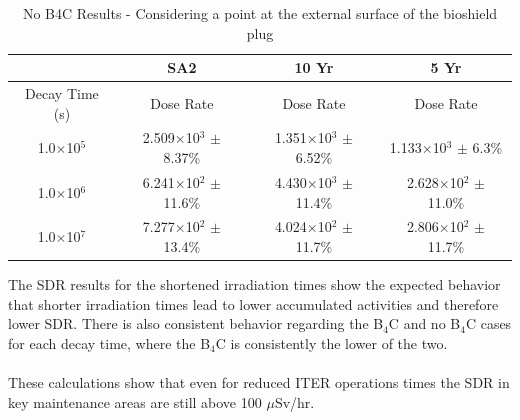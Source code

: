 \documentclass[12pt]{article}
\begin{document}
\begin{table}[ht!]
   \centering      
   \begin{tabular}{| c | c | c | c |}
      \hline
      & SA2 & 10 Yr & 5 Yr \\
      \hline
      Decay Time (s) & Dose Rate & Dose Rate & Dose Rate \\
      \hline
      1.0$\times$10$^{5}$ & 2.509$\times$10$^{3}$ $\pm$ 8.37\% & 1.351$\times$10$^{3}$ $\pm$ 6.52\% & 1.133$\times$10$^{3}$ $\pm$ 6.3\%\\
      1.0$\times$10$^{6}$ & 6.241$\times$10$^{2}$ $\pm$ 11.6\% & 4.430$\times$10$^{3}$ $\pm$ 11.4\% & 2.628$\times$10$^{2}$ $\pm$ 11.0\%\\
      1.0$\times$10$^{7}$ & 7.277$\times$10$^{2}$ $\pm$ 13.4\% & 4.024$\times$10$^{2}$ $\pm$ 11.7\% & 2.806$\times$10$^{2}$ $\pm$ 11.7\%\\
      \hline
\end{tabular}
\caption{No B4C Results - Considering a point at the external surface of the bioshield plug}
\label{tab:nob4c_summary_scenario}
\end{table}

The SDR results for the shortened irradiation times show the expected behavior 
that shorter irradiation times lead to lower accumulated activities and therefore
lower SDR.  There is also consistent behavior regarding the B$_4$C and no B$_4$C
cases for each decay time, where the B$_4$C is consistently the lower of the two.
\\
\\
These calculations show that even for reduced ITER operations times the SDR
in key maintenance areas are still above 100 $\mu$Sv/hr. 
\newpage


\newpage
\clearpage
\end{document}

